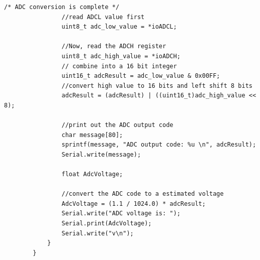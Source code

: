 \documentclass[11pt,pdftex,portrait,letterpaper]{article}
\begin{document}
\begin{lstlisting}[caption={Program 2}, label=l:programx]
				/* ADC conversion is complete */
				//read ADCL value first
				uint8_t adc_low_value = *ioADCL;
				
				//Now, read the ADCH register
				uint8_t adc_high_value = *ioADCH;
				// combine into a 16 bit integer
				uint16_t adcResult = adc_low_value & 0x00FF;
				//convert high value to 16 bits and left shift 8 bits
				adcResult = (adcResult) | ((uint16_t)adc_high_value << 8);
				
				//print out the ADC output code
				char message[80];
				sprintf(message, "ADC output code: %u \n", adcResult);
				Serial.write(message);
				
				float AdcVoltage;
				
				//convert the ADC code to a estimated voltage
				AdcVoltage = (1.1 / 1024.0) * adcResult;
				Serial.write("ADC voltage is: ");
				Serial.print(AdcVoltage);
				Serial.write("v\n");
			}
		}
		
	\end{lstlisting}
	
\end{document}
